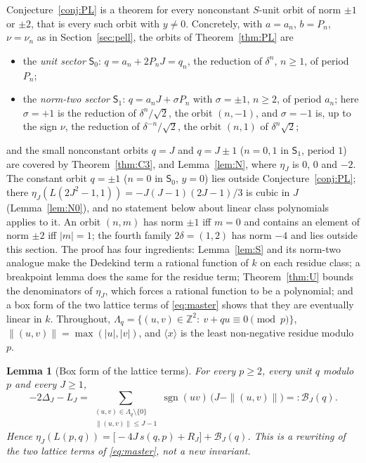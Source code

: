 \documentclass[11pt]{article}
\newtheorem{lemma}[theorem]{Lemma}
\theoremstyle{definition}
\DeclareMathOperator{\sgn}{sgn}
\newcommand{\Z}{\mathbb Z}
\begin{document}
Conjecture~\ref{conj:PL} is a theorem for every nonconstant $S$-unit
orbit of norm $\pm1$ or $\pm2$, that is every such orbit with $y\neq0$.
Concretely, with $a=a_n$, $b=P_n$, $\nu=\nu_n$ as in
Section~\ref{sec:pell}, the orbits of Theorem~\ref{thm:PL} are
\begin{itemize}
\item the \emph{unit sector} $\mathsf S_0$: $q=a_n+2P_nJ=q_n$, the
reduction of $\delta^n$, $n\geq1$, of period $P_n$;
\item the \emph{norm-two sector} $\mathsf S_1$: $q=a_nJ+\sigma P_n$
with $\sigma=\pm1$, $n\geq2$, of period $a_n$; here $\sigma=+1$ is the
reduction of $\delta^n/\sqrt2$, the orbit $(n,-1)$, and $\sigma=-1$ is,
up to the sign $\nu$, the reduction of $\delta^{-n}/\sqrt2$, the orbit
$(n,1)$ of $\delta^n\sqrt2$;
\end{itemize}
and the small nonconstant orbits $q=J$ and $q=J\pm1$ ($n=0,1$ in
$\mathsf S_1$, period $1$) are covered by Theorem~\ref{thm:C3},
\cite[Thm.~7.1]{MahmoodP1Collection2026} and Lemma~\ref{lem:N}, where
$\eta_J$ is $0$, $0$ and $-2$.  The constant orbit $q=\pm1$ ($n=0$ in
$\mathsf S_0$, $y=0$) lies outside Conjecture~\ref{conj:PL}; there
$\eta_J(L(2J^2-1,1))=-J(J-1)(2J-1)/3$ is cubic in $J$
(Lemma~\ref{lem:N0}), and no statement below about linear class
polynomials applies to it.  An orbit $(n,m)$ has norm
$\pm1$ iff $m=0$ and contains an element of norm $\pm2$ iff $|m|=1$; the
fourth family $2\delta=(1,2)$ has norm $-4$ and lies outside this
section.  The proof has four ingredients: Lemma~\ref{lem:S} and its
norm-two analogue make the Dedekind term a rational function of $k$ on
each residue class; a breakpoint lemma does the same for the residue
term; Theorem~\ref{thm:U} bounds the denominators of $\eta_J$, which
forces a rational function to be a polynomial; and a box form of the two
lattice terms of \eqref{eq:master} shows that they are eventually linear
in $k$.  Throughout, $\Lambda_q=\{(u,v)\in\Z^2:\ v+qu\equiv0\pmod p\}$,
$\|(u,v)\|=\max(|u|,|v|)$, and $\langle x\rangle$ is the least
non-negative residue modulo $p$.

\begin{lemma}[Box form of the lattice terms]
\label{lem:box}
For every $p\geq2$, every unit $q$ modulo $p$ and every $J\geq1$,
\begin{equation}
 -2\Delta_J-L_J=\sum_{\substack{(u,v)\in\Lambda_q\setminus\{0\}\\
 \|(u,v)\|\leq J-1}}\sgn(uv)\,\bigl(J-\|(u,v)\|\bigr)=:\mathcal B_J(q).
 \label{eq:box}
\end{equation}
Hence $\eta_J(L(p,q))=\bigl[-4J\,s(q,p)+R_J\bigr]+\mathcal B_J(q)$.  This
is a rewriting of the two lattice terms of \eqref{eq:master}, not a new
invariant.
\end{lemma}
\end{document}
